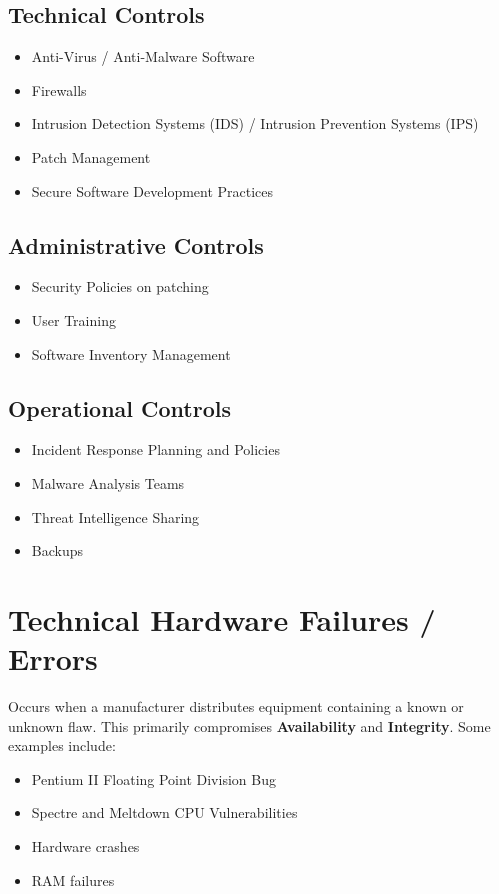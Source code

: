 \documentclass[12pt letter]{report}
\begin{document}
\subsection{Technical Controls}

\begin{itemize}
  \item Anti-Virus / Anti-Malware Software
  \item Firewalls
  \item Intrusion Detection Systems (IDS) / Intrusion Prevention Systems (IPS)
  \item Patch Management
  \item Secure Software Development Practices
\end{itemize}

\subsection{Administrative Controls}

\begin{itemize}
  \item Security Policies on patching
  \item User Training
  \item Software Inventory Management
\end{itemize}

\subsection{Operational Controls}

\begin{itemize}
  \item Incident Response Planning and Policies
  \item  Malware Analysis Teams
  \item Threat Intelligence Sharing
  \item Backups
\end{itemize}

\section{Technical Hardware Failures / Errors}

Occurs when a manufacturer distributes equipment containing a known
or unknown flaw. This primarily compromises \textbf{Availability} and
\textbf{Integrity}. Some examples include:
\begin{itemize}
  \item Pentium II Floating Point Division Bug
  \item Spectre and Meltdown CPU Vulnerabilities
  \item Hardware crashes
  \item RAM failures
\end{itemize}
\end{document}
